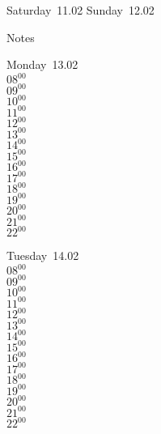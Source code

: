 \documentclass[11pt,a4paper]{book}\usepackage[]{graphicx}\usepackage[]{color}
\begin{document}
\begin{weekendbox}
  Saturday~11.02
  \tcblower
  Sunday~12.02
\end{weekendbox} %
\begin{notebox}
  Notes
\end{notebox}
\clearpage
\begin{headerbox}
\end{headerbox}
\begin{weekdaybox}
  Monday~13.02\\
  { 
  \vfill
  $08^{00}$\\
$09^{00}$\\
$10^{00}$\\
$11^{00}$\\
$12^{00}$\\
$13^{00}$\\
$14^{00}$\\
$15^{00}$\\
$16^{00}$\\
$17^{00}$\\
$18^{00}$\\
$19^{00}$\\
$20^{00}$\\
$21^{00}$\\
$22^{00}$\\
  }
\end{weekdaybox}
\begin{weekdaybox}
  Tuesday~14.02\\
  { 
  \vfill
  $08^{00}$\\
$09^{00}$\\
$10^{00}$\\
$11^{00}$\\
$12^{00}$\\
$13^{00}$\\
$14^{00}$\\
$15^{00}$\\
$16^{00}$\\
$17^{00}$\\
$18^{00}$\\
$19^{00}$\\
$20^{00}$\\
$21^{00}$\\
$22^{00}$\\
  }
\end{weekdaybox}
\end{document}
